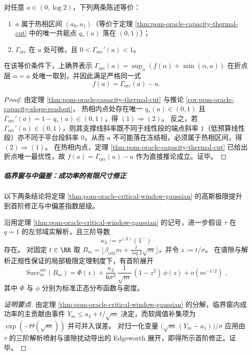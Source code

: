 \begin{theorem}\label{thm:pom-oracle-thermal-point-criteria}
对任意 \(a\in(0,\log 2)\)，下列两条陈述等价：
\begin{enumerate}
  \item \(a\) 属于热相区间 \((a_0,a_1)\)（等价于定理 \ref{thm:pom-oracle-capacity-thermal-cut} 中的唯一共轭点 \(q_*(a)\) 落在 \((0,1)\)）；
  \item \(\Gamma_{\mathrm{orc}}\) 在 \(a\) 处可微，且 \(0<\Gamma_{\mathrm{orc}}'(a)<1\)。
\end{enumerate}
在该等价条件下，上确界表示
\(
\Gamma_{\mathrm{orc}}(a)=\sup_{\alpha}(f(\alpha)+\min(\alpha,a))
\)
在折点层 \(\alpha=a\) 处唯一取到，并因此满足严格同一式
\[
\boxed{\;f(a)=\Gamma_{\mathrm{orc}}(a)-a.\;}
\]
\end{theorem}
\begin{proof}
由定理 \ref{thm:pom-oracle-capacity-thermal-cut} 与推论 \ref{cor:pom-oracle-capacity-slope-readout}，
热相内点处存在唯一 \(q_*(a)\in(0,1)\) 且 \(\Gamma_{\mathrm{orc}}'(a)=1-q_*(a)\in(0,1)\)，得 \((1)\Rightarrow(2)\)。
反之，若 \(\Gamma_{\mathrm{orc}}'(a)\in(0,1)\)，则其支撑线斜率既不同于线性段的端点斜率 \(1\)（低预算线性段）亦不同于平台段斜率 \(0\)，从而 \(a\) 不可能落在冻结相，必须属于热相区间，得 \((2)\Rightarrow(1)\)。
在热相内点，定理 \ref{thm:pom-oracle-capacity-thermal-cut} 已给出折点唯一最优性，故 \(f(a)=\Gamma_{\mathrm{orc}}(a)-a\) 作为直接推论成立。证毕。
\end{proof}

\subparagraph{临界窗与中偏差：成功率的有限尺寸修正}
以下两条结论将定理 \ref{thm:pom-oracle-critical-window-gaussian} 的高斯极限提升到首阶修正与中偏差指数层级。

\begin{theorem}\label{thm:pom-oracle-critical-window-edgeworth}
沿用定理 \ref{thm:pom-oracle-critical-window-gaussian} 的记号，进一步假设 \(\tau\) 在 \(q=1\) 的左邻域实解析，且三阶导数
\[
\kappa_3:=\tau^{(3)}(1^-)
\]
存在。
对固定 \(t\in\RR\) 取
\(
B_m=\bigl\lfloor \beta_{\mathrm{crit}}m+\frac{t}{\log 2}\sqrt m\bigr\rfloor
\)，并令 \(z:=t/\sigma\)。
在谱隙与解析正规性保证的局部极限定理制度下，有首阶展开
\[
\boxed{\;
\mathrm{Succ}^{\mathrm{orc}}_m(B_m)
=\Phi(z)+\frac{\kappa_3}{6\sigma^3}\,\frac{1}{\sqrt m}\,(1-z^2)\,\phi(z)+o(m^{-1/2})\; } ,
\]
其中 \(\Phi\) 与 \(\phi\) 分别为标准正态分布函数与密度。
\end{theorem}
\begin{proof}[证明要点]
由定理 \ref{thm:pom-oracle-critical-window-gaussian} 的分解，临界窗内成功率的主贡献由事件 \(Y_m\le a_1+t/\sqrt m\) 决定，而软阈值补集项为 \(\exp(-\Theta(\sqrt m))\) 并可并入误差。
对归一化变量 \(\bigl(\sqrt m\,(Y_m-a_1)\bigr)/\sigma\) 应用由 \(\tau\) 的三阶解析喷射与谱隙扰动导出的 Edgeworth 展开，即得所示首阶修正。证毕。
\end{proof}

